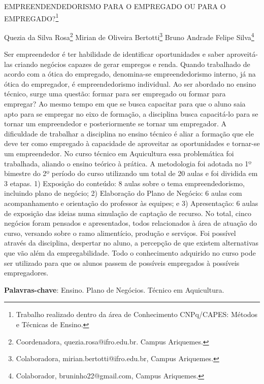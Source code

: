 \documentclass[article,12pt,onesidea,4paper,english,brazil]{abntex2}
\begin{document}
	
	
	\frenchspacing 
	
	\begin{center}
		\LARGE EMPREENDENDEDORISMO PARA O EMPREGADO OU PARA O EMPREGADO?\footnote{Trabalho realizado dentro da área de Conhecimento CNPq/CAPES: Métodos e Técnicas de Ensino.}
		
		\normalsize
		Quezia da Silva Rosa\footnote{Coordenadora, quezia.rosa@ifro.edu.br. Campus Ariquemes.} 
	Mirian de Oliveira Bertotti\footnote{Colaboradora, mirian.bertotti@ifro.edu.br, Campus Ariquemes.} 
		Bruno Andrade Felipe Silva\footnote{Colaborador, bruninho22@gmail.com, Campus Ariquemes.} 
	\end{center}
	
	\noindent Ser empreendedor é ter habilidade de identificar oportunidades e saber aproveitá-las
	criando negócios capazes de gerar empregos e renda. Quando trabalhado de
	acordo com a ótica do empregado, denomina-se empreendedorismo interno, já na
	ótica do empregador, é empreendedorismo individual. Ao ser abordado no ensino
	técnico, surge uma questão: formar para ser empregado ou formar para empregar?
	Ao mesmo tempo em que se busca capacitar para que o aluno saia apto para se
	empregar no eixo de formação, a disciplina busca capacitá-lo para se tornar um
	empreendedor e posteriormente se tornar um empregador. A dificuldade de trabalhar
	a disciplina no ensino técnico é aliar a formação que ele deve ter como empregado à
	capacidade de aproveitar as oportunidades e tornar-se um empreendedor. No curso
	técnico em Aquicultura essa problemática foi trabalhada, aliando o ensino teórico à
	prática. A metodologia foi adotada no 1º bimestre do 2º período do curso utilizando
	um total de 20 aulas e foi dividida em 3 etapas. 1) Exposição do conteúdo: 8 aulas
	sobre o tema empreendedorismo, incluindo plano de negócio; 2) Elaboração do
	Plano de Negócio: 6 aulas com acompanhamento e orientação do professor às
	equipes; e 3) Apresentação: 6 aulas de exposição das ideias numa simulação de
	captação de recurso. No total, cinco negócios foram pensados e apresentados,
	todos relacionados à área de atuação do curso, versando sobre o ramo alimentício,
	produção e serviços. Foi possível através da disciplina, despertar no aluno, a
	percepção de que existem alternativas que vão além da empregabilidade. Todo o
	conhecimento adquirido no curso pode ser utilizado para que os alunos passem de
	possíveis empregados à possíveis empregadores.
	
	\vspace{\onelineskip}
	
	\noindent
	\textbf{Palavras-chave}: Ensino. Plano de Negócios. Técnico em Aquicultura.
	
\end{document}

